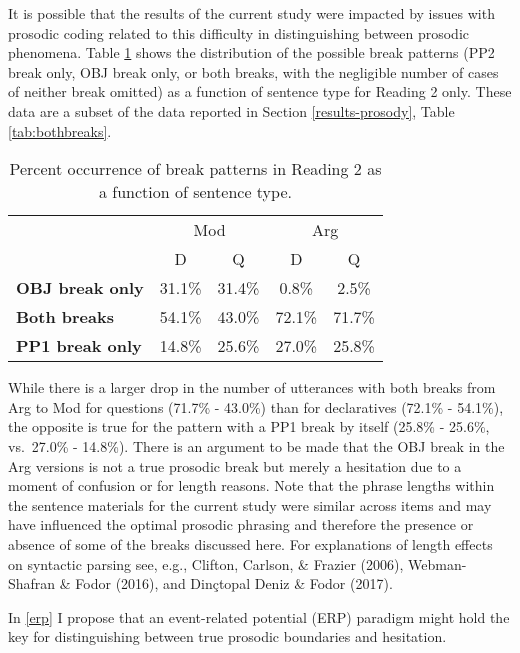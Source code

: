 \documentclass[11pt,oneside]{book}
\begin{document}
It is possible that the results of the current study were impacted by issues with prosodic coding related to this difficulty in distinguishing between prosodic phenomena. Table \ref{tab:combobr} shows the distribution of the possible break patterns (PP2 break only, OBJ break only, or both breaks, with the negligible number of cases of neither break omitted) as a function of sentence type for Reading 2 only. These data are a subset of the data reported in Section \ref{results-prosody}, Table \ref{tab:bothbreaks}.

\begin{table}[!h]

\caption{\label{tab:combobr}Percent occurrence of break patterns in Reading 2 as a function of sentence type.}
\centering
\begin{tabular}{>{\bfseries}lcccc}
\toprule
\multicolumn{1}{c}{ } & \multicolumn{2}{c}{Mod} & \multicolumn{2}{c}{Arg} \\
\cmidrule(l{3pt}r{3pt}){2-3} \cmidrule(l{3pt}r{3pt}){4-5}
  & D & Q & D & Q\\
\midrule
OBJ break only & 31.1\% & 31.4\% & 0.8\% & 2.5\%\\
Both breaks & 54.1\% & 43.0\% & 72.1\% & 71.7\%\\
PP1 break only & 14.8\% & 25.6\% & 27.0\% & 25.8\%\\
\bottomrule
\end{tabular}
\end{table}

While there is a larger drop in the number of utterances with both breaks from Arg to Mod for questions (71.7\% - 43.0\%) than for declaratives (72.1\% - 54.1\%), the opposite is true for the pattern with a PP1 break by itself (25.8\% - 25.6\%, vs.~27.0\% - 14.8\%). There is an argument to be made that the OBJ break in the Arg versions is not a true prosodic break but merely a hesitation due to a moment of confusion or for length reasons. Note that the phrase lengths within the sentence materials for the current study were similar across items and may have influenced the optimal prosodic phrasing and therefore the presence or absence of some of the breaks discussed here. For explanations of length effects on syntactic parsing see, e.g., Clifton, Carlson, \& Frazier (2006), Webman-Shafran \& Fodor (2016), and Dinçtopal Deniz \& Fodor (2017).

In \ref{erp} I propose that an event-related potential (ERP) paradigm might hold the key for distinguishing between true prosodic boundaries and hesitation.
\end{document}
